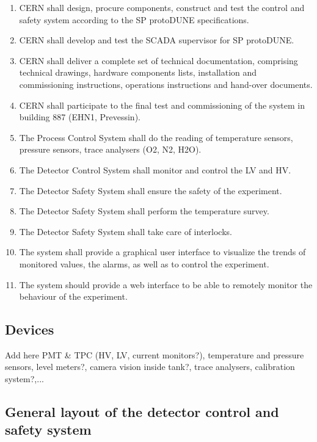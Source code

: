 \begin{enumerate}
\item	CERN shall design, procure components, construct and test the control and safety system according to the SP protoDUNE specifications.
\item	CERN shall develop and test the SCADA supervisor for SP protoDUNE.
\item	CERN shall deliver a complete set of technical documentation, comprising technical drawings, hardware components lists, installation and commissioning instructions, operations instructions and hand-over documents.
\item	CERN shall participate to the final test and commissioning of the system in building 887 (EHN1, Prevessin).
\item	The Process Control System shall do the reading of temperature sensors, pressure sensors, trace analysers (O2, N2, H2O).
\item	The Detector Control System shall monitor and control the LV and HV.
\item	The Detector Safety System shall ensure the safety of the experiment.
\item	The Detector Safety System shall perform the temperature survey.
\item	The Detector Safety System shall take care of interlocks.
\item	The system shall provide a graphical user interface to visualize the trends of monitored values, the alarms, as well as to control the experiment.
\item	The system should provide a web interface to be able to remotely monitor the behaviour of the experiment.
\end{enumerate}

\subsection{Devices}
Add here PMT \& TPC (HV, LV, current monitors?), temperature and pressure sensors, level meters?, camera vision inside tank?, trace analysers, 
calibration system?,... 

\subsection{General layout of the detector control and safety system}


